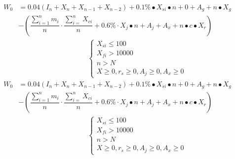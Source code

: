 \documentclass[../mcmpaper]{subfiles}
\begin{document}
\begin{equation}
\begin{aligned}
W_{0}&=0.04\left(I_{n}+X_{n}+X_{n-1}+X_{n-2}\right)+0.1 \% \bullet X_{s i} \bullet n+0+A_{g}+n \bullet X_{g} \\
&-\left(\dfrac{\sum_{i=1}^{n} m_{i}}{n} \cdot \dfrac{\sum_{i=}^{n} X_{c i}}{n}+0.6\% \cdot X_{j} \bullet n+A_{j}+A_{x}+n \bullet c \bullet X_{r}\right) \\
&\hspace{10em}\left\{\begin{array}{l}
X_{s i} \leq 100 \\
X_{f i}>10000 \\
n>N \\
X \geq 0, r_{s} \geq 0, A_{j} \geq 0, A_{x} \geq 0
\end{array}\right.
\end{aligned}
\end{equation}
\begin{equation}
\begin{aligned}
W_{0}&=0.04\left(I_{n}+X_{n}+X_{n-1}+X_{n-2}\right)+0.1 \% \bullet X_{s i} \bullet n+0+A_{g}+n \bullet X_{g} \\
&-\left(\dfrac{\sum_{i=1}^{n} m_{i}}{n} \cdot \dfrac{\sum_{i=}^{n} X_{c i}}{n}+0.6\% \cdot X_{j} \bullet n+A_{j}+A_{x}+n \bullet c \bullet X_{r}\right) \\
&\hspace{10em}\left\{\begin{array}{l}
X_{s i} \leq 100 \\
X_{f i}>10000 \\
n>N \\
X \geq 0, r_{s} \geq 0, A_{j} \geq 0, A_{x} \geq 0
\end{array}\right.
\end{aligned}
\end{equation}
\end{document}
